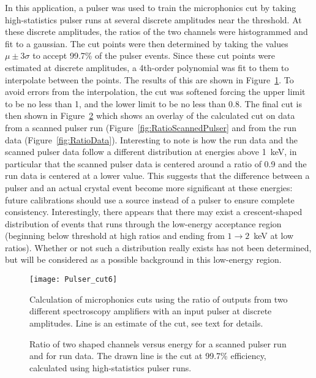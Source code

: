 	In this application, a pulser was used to train the microphonics cut by taking high-statistics pulser runs at several discrete amplitudes near the threshold.  At these discrete amplitudes, the ratios of the two channels were histogrammed and fit to a gaussian.  The cut points were then determined by taking the values $\mu \pm 3 \sigma$ to accept 99.7\% of the pulser events.  Since these cut points were estimated at discrete amplitudes, a 4th-order polynomial was fit to them to interpolate between the points.  The results of this are shown in Figure~\ref{fig:RatioOfShapedChannels}.  To avoid errors from the interpolation, the cut was softened forcing the upper limit to be no less than 1, and the lower limit to be no less than 0.8.  The final cut is then shown in Figure~\ref{fig:RatioOfShapedChannelsFinal} which shows an overlay of the calculated cut on data from a scanned pulser run (Figure~\ref{fig:RatioScannedPulser} and from the run data (Figure~\ref{fig:RatioData}).  Interesting to note is how the run data and the scanned pulser data follow a different distribution at energies above 1~keV, in particular that the scanned pulser data is centered around a ratio of 0.9 and the run data is centered at a lower value.  This suggests that the difference between a pulser and an actual crystal event become more significant at these energies: future calibrations should use a source instead of a pulser to ensure complete consistency.  Interestingly, there appears that there may exist a crescent-shaped distribution of events that runs through the low-energy acceptance region (beginning below threshold at high ratios and ending from $1\to2$~keV at low ratios).  Whether or not such a distribution really exists has not been determined, but will be considered as a possible background in this low-energy region.  

			\begin{figure}
				\centering
				\texttt{[image: Pulser\_cut6]}
				\caption[Calculation of microphonics cuts]
				{Calculation of microphonics cuts using the ratio of outputs from two different spectroscopy amplifiers with an 
				input pulser at discrete amplitudes.  Line is 
				an estimate of the cut, see text for details.  }
				\label{fig:RatioOfShapedChannels}
			\end{figure}

			\begin{figure}
				\centering
				\caption[Microphonics cuts on data and scanned pulser runs]
				{Ratio of two shaped channels versus energy for a scanned pulser run and for run data.  The drawn line is the cut at 99.7\% efficiency, calculated using
				high-statistics pulser runs.}
				\label{fig:RatioOfShapedChannelsFinal}
			\end{figure}
	

